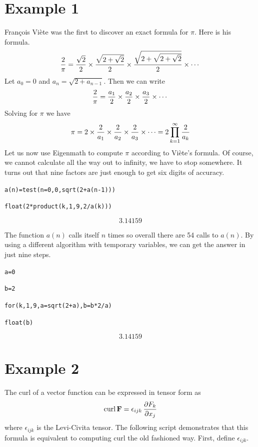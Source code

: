 \documentclass[12pt]{book}
\begin{document}
\section*{Example 1}
Fran\c cois Vi\`ete was the first to discover an exact formula for $\pi$.
Here is his formula.
\begin{displaymath}
{2\over\pi}={\sqrt2\over2}\times{\sqrt{2+\sqrt2}\over2}\times
{\sqrt{2+\sqrt{2+\sqrt2}}\over2}\times\cdots
\end{displaymath}
Let $a_0=0$ and $a_{n}=\sqrt{2+a_{n-1}}$.
Then we can write
\begin{displaymath}
{2\over\pi}={a_1\over2}\times{a_2\over2}\times
{a_3\over2}\times\cdots
\end{displaymath}
%
Solving for $\pi$ we have
\begin{displaymath}
\pi=2\times{2\over a_1}\times{2\over a_2}\times{2\over a_3}\times\cdots=2\prod_{k=1}^\infty
{2\over a_k}
\end{displaymath}
%
Let us now use Eigenmath to compute $\pi$ according to Vi\`ete's formula.
Of course, we cannot calculate all the way out to infinity, we have to stop somewhere.
It turns out that nine factors are just enough to get six digits of accuracy.

\medskip
\verb$a(n)=test(n=0,0,sqrt(2+a(n-1)))$

\verb$float(2*product(k,1,9,2/a(k)))$

$$3.14159$$

\medskip
\noindent
The function $a(n)$ calls itself $n$ times so overall there are
54 calls to $a(n)$.
By using a different algorithm with temporary variables, we can get the
answer in just nine steps.

\medskip
\verb$a=0$

\verb$b=2$

\verb$for(k,1,9,a=sqrt(2+a),b=b*2/a)$

\verb$float(b)$

$$3.14159$$

\newpage

\label{example2}

\section*{Example 2}
The curl of a vector function can be expressed in tensor form as
$$\mathop{\rm curl}{\bf F}=\epsilon_{ijk}\,{\partial F_k\over\partial x_j}$$
where $\epsilon_{ijk}$ is the Levi-Civita tensor.
The following script demonstrates that this formula is equivalent
to computing curl the old fashioned way.
First, define $\epsilon_{ijk}$.
\end{document}

